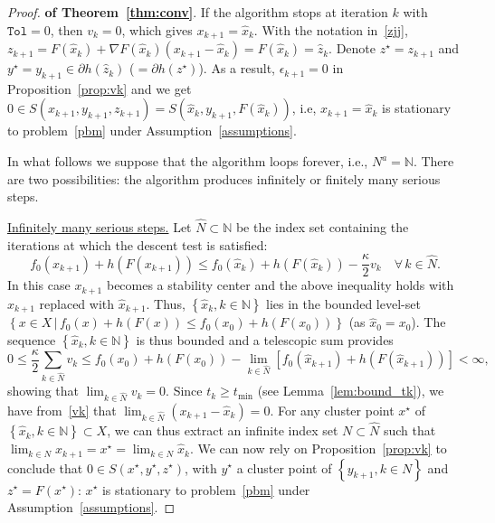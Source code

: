 \documentclass[smallextended,envcountsect]{svjour3}
\newcommand{\col}[1]{\left\{#1\right\}}
\newcommand{\tol}{\texttt{Tol}}
\newcommand{\modelh}{\mathfrak{h}}
\newcommand{\nats}{\mathbb{N}}
\begin{document}
\begin{proof} {\bf of Theorem~\ref{thm:conv}}.
 If the algorithm stops at iteration $k$ with $\tol = 0$, then $v_k = 0$, which gives $x_{k+1}=\hat x_k$.
With the notation in~\eqref{zjj}, $z_{k+1}  =F(\hat x_k)+\nabla F(\hat x_k) (x_{k+1}-\hat x_k)=   F(\hat x_k)=\hat z_k$. Denote $z^\star = z_{k+1}$ and $y^\star = y_{k+1}\in \partial h(\hat z_k)$ ($= \partial h(z^\star)$).
 As a result, $\epsilon_{k+1}=0$ in Proposition~\ref{prop:vk} and we get $0\in S(x_{k+1},y_{k+1},z_{k+1})=S(\hat x_k,y_{k+1},F(\hat x_k))$,
i.e, $x_{k+1}=\hat x_k$ is stationary to problem~\eqref{pbm} under Assumption~\ref{assumptions}.


In what follows we suppose that the algorithm loops forever, i.e., $N^a=\nats$. There are two possibilities: the algorithm produces infinitely or finitely many serious steps.

\noindent \underline{Infinitely many serious steps.}
Let $\hat N \subset \nats$ be the index set
containing the iterations at which the descent test is satisfied:
\[
f_0(x_{k+1}) +h(F(x_{k+1})) \leq f_0(\hat x_{k})+ h(F(\hat x_k))-  \frac{\kappa}{2} v_k\quad \forall\, k \in \hat N.
\]
In this case $x_{k+1}$ becomes a stability center and the above inequality holds with $x_{k+1}$ replaced with $\hat x_{k+1}$.
Thus, $\col{\hat x_k, k \in \nats}$ lies in the bounded level-set $\col{x \in X\,|\, f_0(x) +h(F(x))\leq  f_0(x_0) +h(F(x_0))}$ (as $\hat x_0=x_0$). The sequence $\col{\hat x_k, k \in \nats}$  is thus bounded and a telescopic sum provides
\[
0\leq  \frac{\kappa}{2} \sum_{k \in \hat N}v_k\leq  
f_0(x_0) +h(F(x_0))-\lim_{k \in \hat N} [f_0(\hat x_{k+1}) +h(F(\hat x_{k+1}))] <\infty,
\]
showing that $\lim_{k\in \hat N } v_k= 0$. Since $t_k\geq t_{\min}$ (see Lemma~\ref{lem:bound_tk}), we have from~\eqref{vk} that $\lim_{k\in \hat N} (x_{k+1}-\hat x_k)=0$. For any cluster point $x^\star $ of $\col{\hat x_k, k \in \nats}\subset X$, we can thus extract an infinite index set $N \subset \hat N$ such that $\lim_{k\in N} x_{k+1}=x^\star=\lim_{k\in N} \hat x_{k}$. 
%
We can now rely on Proposition~\ref{prop:vk} to conclude that 
$0\in S(x^\star, y^\star, z^\star)$, with $ y^\star$ a cluster point of $\col{y_{k+1}, k \in N}$ and $z^\star=F( x^\star)$:  $x^\star$ is stationary to problem~\eqref{pbm} under Assumption~\ref{assumptions}.



\end{proof}
\end{document}

